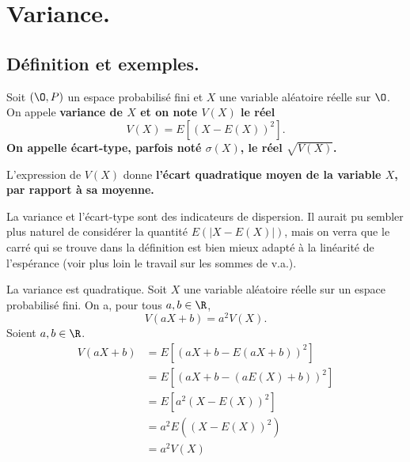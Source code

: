 \documentclass[11pt]{article}
\begin{document}
\section{Variance.}
\subsection{Définition et exemples.}

\begin{defi}{}{}
    Soit $(\O,P)$ un espace probabilisé fini et $X$ une variable aléatoire réelle sur $\O$.\\
    On appele \bf{variance} de $X$ et on note $V(X)$ le réel
    \begin{equation*}
        V(X)=E\left[ (X-E(X))^2 \right].
    \end{equation*}
    On appelle \bf{écart-type}, parfois noté $\sigma(X)$, le réel $\sqrt{V(X)}$.
\end{defi}

\begin{inter}{}{}
    L'expression de $V(X)$ donne \bf{l'écart quadratique moyen} de la variable $X$, par rapport à sa moyenne.
    \begin{center}
    \end{center}
    La variance et l'écart-type sont des indicateurs de dispersion. Il aurait pu sembler plus naturel de considérer la quantité $E(|X-E(X)|)$, mais on verra que le carré qui se trouve dans la définition est bien mieux adapté à la linéarité de l'espérance (voir plus loin le travail sur les sommes de v.a.).
\end{inter}

\begin{prop}{La variance est quadratique.}{}
    Soit $X$ une variable aléatoire réelle sur un espace probabilisé fini. On a, pour tous $a,b\in\R$,
    \begin{equation*}
        V(aX+b)=a^2V(X).
    \end{equation*}
    \tcblower
    Soient $a,b\in\R$.
    \begin{align*}
        V(aX+b)&=E[(aX+b-E(aX+b))^2]\\
        &= E[(aX+b-(aE(X)+b))^2]\\
        &= E[a^2(X-E(X))^2]\\
        &= a^2E((X-E(X))^2)\\
        &= a^2V(X)
    \end{align*}
\end{prop}
\end{document}
